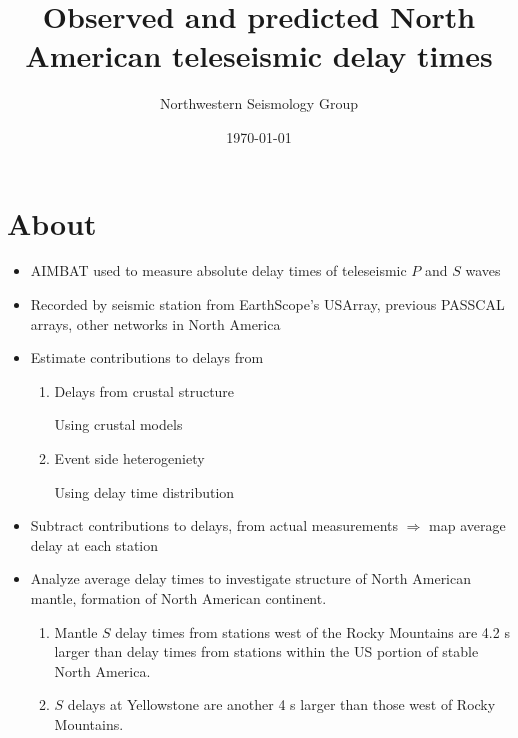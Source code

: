 \documentclass[letterpaper,10pt]{article}
\title{Observed and predicted North American teleseismic delay times}
\author{Northwestern Seismology Group}
\date{\today}
\begin{document}
\maketitle


\section{About}

\begin{itemize}
  \item AIMBAT used to measure absolute delay times of teleseismic $P$ and $S$ waves 
  \item Recorded by seismic station from EarthScope's USArray, previous PASSCAL arrays, other networks in North America
  \item Estimate contributions to delays from
        \begin{enumerate}
          \item Delays from crustal structure

                Using crustal models
          \item Event side heterogeniety

                Using delay time distribution
        \end{enumerate}
  \item Subtract contributions to delays, from actual measurements $\Rightarrow$ map average delay at each station 
  \item Analyze average delay times to investigate structure of North American mantle, formation of North American continent. 
        \begin{enumerate}
          \item Mantle $S$ delay times from stations west of the Rocky Mountains are 4.2 s larger than delay times from stations within the US portion of stable North America.
          \item $S$ delays at Yellowstone are another 4 s larger than those west of Rocky Mountains. 
        \end{enumerate}
\end{itemize}





















\end{document}
